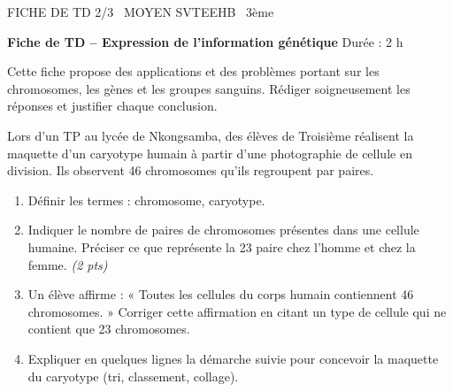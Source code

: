 \documentclass[11pt]{article}
\begin{document}
\begin{tcolorbox}[enhanced,colback=popink,colframe=popink,arc=10pt,boxrule=0pt,left=12pt,right=12pt,top=9pt,bottom=9pt]
{\color{white}\popxbold\small FICHE DE TD 2/3 \textbullet\ MOYEN \hfill SVTEEHB \textbullet\ 3ème\par}
\end{tcolorbox}
\vspace{4pt}
\textbf{Fiche de TD -- Expression de l'information génétique} \hfill Durée : 2 h

Cette fiche propose des applications et des problèmes portant sur les chromosomes, les gènes et les groupes sanguins. Rédiger soigneusement les réponses et justifier chaque conclusion.

\begin{exercice}
Lors d'un TP au lycée de Nkongsamba, des élèves de Troisième réalisent la maquette d'un caryotype humain à partir d'une photographie de cellule en division. Ils observent 46 chromosomes qu'ils regroupent par paires.
\begin{enumerate}
\item Définir les termes : chromosome, caryotype.
\item Indiquer le nombre de paires de chromosomes présentes dans une cellule humaine. Préciser ce que représente la 23\ieme{} paire chez l'homme et chez la femme. \textit{(2 pts)}
\item Un élève affirme : « Toutes les cellules du corps humain contiennent 46 chromosomes. » Corriger cette affirmation en citant un type de cellule qui ne contient que 23 chromosomes.
\item Expliquer en quelques lignes la démarche suivie pour concevoir la maquette du caryotype (tri, classement, collage).
\end{enumerate}
\end{exercice}
\end{document}
